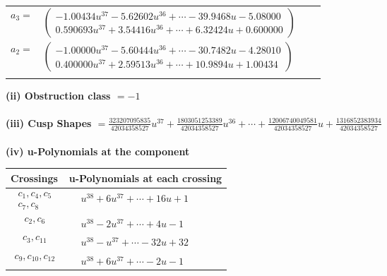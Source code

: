 \documentclass[1p]{elsarticle_modified}
\theoremstyle{definition}
\begin{document}
\begin{tabular}{m{7pt} m{180pt} m{7pt} m{180pt} }
\flushright $a_{3}=$&$\begin{pmatrix}-1.00434 u^{37}-5.62602 u^{36}+\cdots-39.9468 u-5.08000\\0.590693 u^{37}+3.54416 u^{36}+\cdots+6.32424 u+0.600000\end{pmatrix}$ \\
\flushright $a_{2}=$&$\begin{pmatrix}-1.00000 u^{37}-5.60444 u^{36}+\cdots-30.7482 u-4.28010\\0.400000 u^{37}+2.59513 u^{36}+\cdots+10.9894 u+1.00434\end{pmatrix}$\\&\end{tabular}
\flushleft \textbf{(ii) Obstruction class $= -1$}\\~\\
\flushleft \textbf{(iii) Cusp Shapes $= \frac{323207095835}{42034358527} u^{37}+\frac{1803051253389}{42034358527} u^{36}+\cdots+\frac{12006740049581}{42034358527} u+\frac{1316852383934}{42034358527}$}\\~\\
\newpage\renewcommand{\arraystretch}{1}
\flushleft \textbf{(iv) u-Polynomials at the component}\newline \\
\begin{tabular}{m{50pt}|m{274pt}}
Crossings & \hspace{64pt}u-Polynomials at each crossing \\
\hline $$\begin{aligned}c_{1},c_{4},c_{5}\\c_{7},c_{8}\end{aligned}$$&$\begin{aligned}
&u^{38}+6 u^{37}+\cdots+16 u+1
\end{aligned}$\\
\hline $$\begin{aligned}c_{2},c_{6}\end{aligned}$$&$\begin{aligned}
&u^{38}-2 u^{37}+\cdots+4 u-1
\end{aligned}$\\
\hline $$\begin{aligned}c_{3},c_{11}\end{aligned}$$&$\begin{aligned}
&u^{38}- u^{37}+\cdots-32 u+32
\end{aligned}$\\
\hline $$\begin{aligned}c_{9},c_{10},c_{12}\end{aligned}$$&$\begin{aligned}
&u^{38}+6 u^{37}+\cdots-2 u-1
\end{aligned}$\\
\hline
\end{tabular}\\~\\
\end{document}
